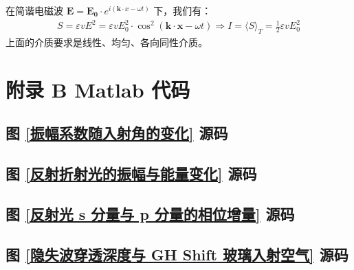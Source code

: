 \documentclass[UTF8]{report}
\theoremstyle{MyLineTheoremStyle} %
\theoremstyle{MyBlockTheoremStyle} %
\theoremstyle{MySubsubsectionStyle} %
\begin{document}
在简谐电磁波 $\boldsymbol{E} = \boldsymbol{E_0}\cdot e^{i\left(\boldsymbol{k}\cdot x - \omega t\right)}$ 下，我们有：
\begin{gather}
S = \varepsilon v E^2 = \varepsilon v E_0^2 \cdot \cos^2 \left(\boldsymbol{k}\cdot \boldsymbol{x} - \omega t\right)
\Longrightarrow  
I = \langle  S  \rangle_T = \frac{1}{2}\varepsilon v E_0^2
\end{gather}
上面的介质要求是线性、均匀、各向同性介质。

\chapter*{附录 B\hspace*{20pt}  Matlab 代码}
\thispagestyle{fancy}
\setcounter{chapter}{2} 
\setcounter{equation}{0}    %
\setcounter{section}{0}   
\renewcommand\thesection{B.\arabic{section}}   
\renewcommand{\thefigure}{B.\arabic{figure}} 
\renewcommand{\thetable}{B.\arabic{table}}

\section{图 \ref{振幅系数随入射角的变化} 源码}
\label{振幅系数随入射角的变化 源码}


\section{图 \ref{反射折射光的振幅与能量变化} 源码}
\label{反射折射光的振幅与能量变化 源码}



\section{图 \ref{反射光 s 分量与 p 分量的相位增量} 源码}
\label{反射光 s 分量与 p 分量的相位增量 源码}



\section{图 \ref{隐失波穿透深度与 GH Shift 玻璃入射空气} 源码}
\label{隐失波穿透深度与 GH Shift 玻璃入射空气 源码}

\end{document}
